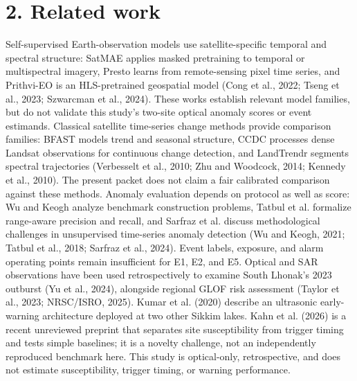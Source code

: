 \documentclass[9pt,twocolumn]{article}
\begin{document}
\section*{2. Related work}
Self-supervised Earth-observation models use satellite-specific temporal and spectral structure: SatMAE applies masked pretraining to temporal or multispectral imagery, Presto learns from remote-sensing pixel time series, and Prithvi-EO is an HLS-pretrained geospatial model (Cong et al., 2022; Tseng et al., 2023; Szwarcman et al., 2024). These works establish relevant model families, but do not validate this study's two-site optical anomaly scores or event estimands.
Classical satellite time-series change methods provide comparison families: BFAST models trend and seasonal structure, CCDC processes dense Landsat observations for continuous change detection, and LandTrendr segments spectral trajectories (Verbesselt et al., 2010; Zhu and Woodcock, 2014; Kennedy et al., 2010). The present packet does not claim a fair calibrated comparison against these methods.
Anomaly evaluation depends on protocol as well as score: Wu and Keogh analyze benchmark construction problems, Tatbul et al. formalize range-aware precision and recall, and Sarfraz et al. discuss methodological challenges in unsupervised time-series anomaly detection (Wu and Keogh, 2021; Tatbul et al., 2018; Sarfraz et al., 2024). Event labels, exposure, and alarm operating points remain insufficient for E1, E2, and E5.
Optical and SAR observations have been used retrospectively to examine South Lhonak's 2023 outburst (Yu et al., 2024), alongside regional GLOF risk assessment (Taylor et al., 2023; NRSC/ISRO, 2025). Kumar et al. (2020) describe an ultrasonic early-warning architecture deployed at two other Sikkim lakes. Kahn et al. (2026) is a recent unreviewed preprint that separates site susceptibility from trigger timing and tests simple baselines; it is a novelty challenge, not an independently reproduced benchmark here. This study is optical-only, retrospective, and does not estimate susceptibility, trigger timing, or warning performance.
\end{document}
